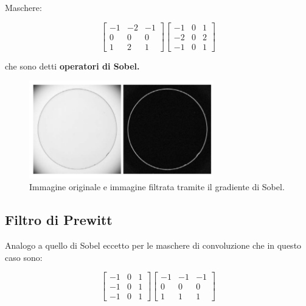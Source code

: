 Maschere:

\begin{center}
    \[
        \begin{bmatrix}
            -1 & -2 & -1 \\
            0  & 0  & 0  \\
            1  & 2  & 1
        \end{bmatrix}
        \begin{bmatrix}
            -1 & 0 & 1 \\
            -2 & 0 & 2 \\
            -1 & 0 & 1
        \end{bmatrix}
    \]
\end{center}

che sono detti \textbf{operatori di Sobel.}

\begin{figure}[H]
    \centering
    \includegraphics[width=8cm, keepaspectratio]{capitoli/immagini/imgs/sobel.png}
    \caption{Immagine originale e immagine filtrata tramite il gradiente di Sobel.}
\end{figure}

\subsection{Filtro di Prewitt}
Analogo a quello di Sobel eccetto per le maschere di convoluzione
che in questo caso sono:
\begin{center}
    \[
        \begin{bmatrix}
            -1 & 0 & 1 \\
            -1 & 0 & 1 \\
            -1 & 0 & 1
        \end{bmatrix}
        \begin{bmatrix}
            -1 & -1 & -1 \\
            0  & 0  & 0  \\
            1  & 1  & 1
        \end{bmatrix}
    \]
\end{center}


